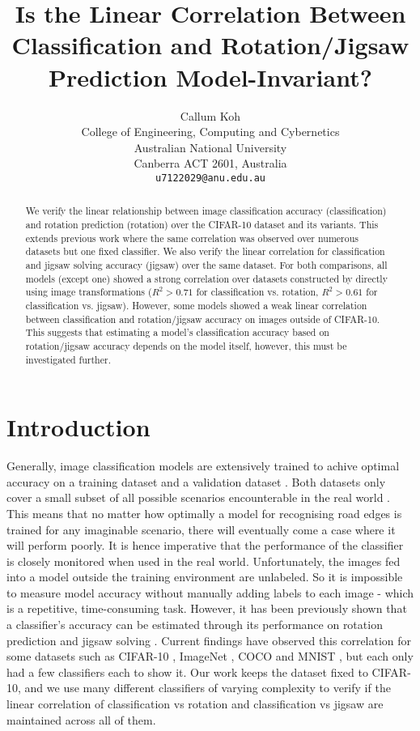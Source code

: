 \documentclass{article}
\title{Is the Linear Correlation Between Classification and Rotation/Jigsaw Prediction Model-Invariant?}
\author{%
  Callum Koh\\
  College of Engineering, Computing and Cybernetics\\
  Australian National University\\
  Canberra ACT 2601, Australia \\
  \texttt{u7122029@anu.edu.au} \\
}
\begin{document}
\maketitle


\begin{abstract}
We verify the linear relationship between image classification accuracy (classification) and rotation prediction (rotation) over the CIFAR-10 dataset and its variants. This extends previous work where the same correlation was observed over numerous datasets but one fixed classifier. We also verify the linear correlation for classification and jigsaw solving accuracy (jigsaw) over the same dataset. For both comparisons, all models (except one) showed a strong correlation over datasets constructed by directly using image transformations ($R^2 > 0.71$ for classification vs. rotation, $R^2 > 0.61$ for classification vs. jigsaw). However, some models showed a weak linear correlation between classification and rotation/jigsaw accuracy on images outside of CIFAR-10. This suggests that estimating a model's classification accuracy based on rotation/jigsaw accuracy depends on the model itself, however, this must be investigated further.
\end{abstract}

\section{Introduction}
Generally, image classification models are extensively trained to achive optimal accuracy on a training dataset and a validation dataset \cite{dridi2021supervised, nasteski2017overview}. Both datasets only cover a small subset of all possible scenarios encounterable in the real world \cite{gopalan2011domain}. This means that no matter how optimally a model for recognising road edges is trained for any imaginable scenario, there will eventually come a case where it will perform poorly. It is hence imperative that the performance of the classifier is closely monitored when used in the real world. Unfortunately, the images fed into a model outside the training environment are unlabeled. So it is impossible to measure model accuracy without manually adding labels to each image - which is a repetitive, time-consuming task. However, it has been previously shown that a classifier's accuracy can be estimated through its performance on rotation prediction and jigsaw solving \cite{Deng:ICML2021}. Current findings have observed this correlation for some datasets such as CIFAR-10 \cite{krizhevsky2009learning}, ImageNet \cite{deng2009imagenet}, COCO \cite{cocodataset} and MNIST \cite{deng2012mnist}, but each only had a few classifiers each to show it. Our work keeps the dataset fixed to CIFAR-10, and we use many different classifiers of varying complexity to verify if the linear correlation of classification vs rotation and classification vs jigsaw are maintained across all of them.
\end{document}
